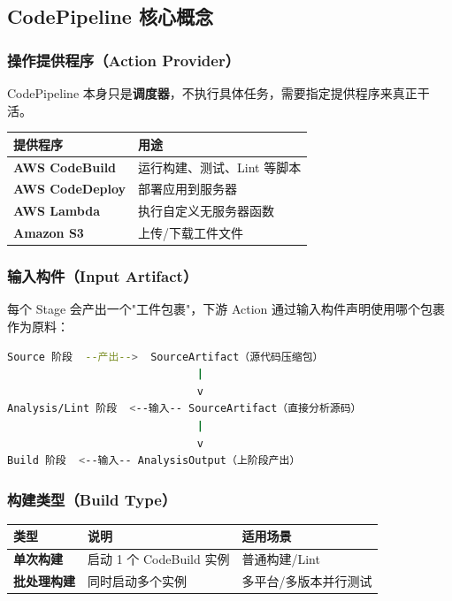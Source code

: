 \documentclass[12pt, a4paper]{article}
\begin{document}
\subsection{CodePipeline 核心概念}

\subsubsection{操作提供程序（Action Provider）}

\begin{notebox}
    CodePipeline 本身只是\textbf{调度器}，不执行具体任务，需要指定提供程序来真正干活。
\end{notebox}

\begin{center}
\begin{tabular}{>{\bfseries}p{3.5cm} p{9cm}}
    \toprule
    提供程序 & 用途 \\
    \midrule
    AWS CodeBuild & 运行构建、测试、Lint 等脚本 \\
    AWS CodeDeploy & 部署应用到服务器 \\
    AWS Lambda & 执行自定义无服务器函数 \\
    Amazon S3 & 上传/下载工件文件 \\
    \bottomrule
\end{tabular}
\end{center}

\subsubsection{输入构件（Input Artifact）}

每个 Stage 会产出一个"工件包裹"，下游 Action 通过输入构件声明使用哪个包裹作为原料：

\begin{lstlisting}[language=bash, caption=构件流转示意]
Source 阶段  --产出-->  SourceArtifact（源代码压缩包）
                              |
                              v
Analysis/Lint 阶段  <--输入-- SourceArtifact（直接分析源码）
                              |
                              v
Build 阶段  <--输入-- AnalysisOutput（上阶段产出）
\end{lstlisting}

\subsubsection{构建类型（Build Type）}

\begin{center}
\begin{tabular}{>{\bfseries}p{3cm} p{5cm} p{4.5cm}}
    \toprule
    类型 & 说明 & 适用场景 \\
    \midrule
    单次构建 & 启动 1 个 CodeBuild 实例 & 普通构建/Lint \\
    批处理构建 & 同时启动多个实例 & 多平台/多版本并行测试 \\
    \bottomrule
\end{tabular}
\end{center}
\end{document}
